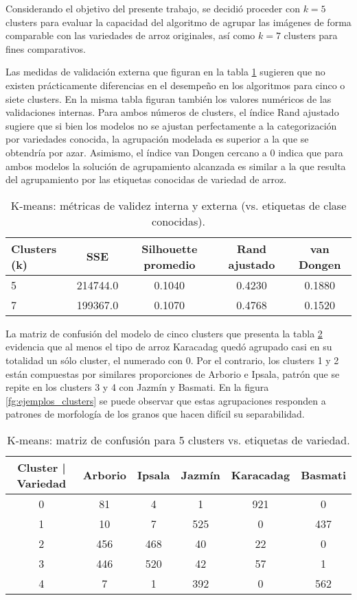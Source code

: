 \documentclass{article}
\begin{document}
Considerando el objetivo del presente trabajo, se decidió proceder con \(k = 5\) clusters para evaluar la capacidad del algoritmo de agrupar las imágenes de forma comparable con las variedades de arroz originales, así como \(k = 7\) clusters para fines comparativos. 

Las medidas de validación externa que figuran en la tabla \ref{tab:kmeans} sugieren que no existen prácticamente diferencias en el desempeño en los algoritmos para cinco o siete clusters.
En la misma tabla figuran también los valores numéricos de las validaciones internas.
Para ambos números de clusters, el índice Rand ajustado sugiere que si bien los modelos no se ajustan perfectamente a la categorización por variedades conocida, la agrupación modelada es superior a la que se obtendría por azar.
Asimismo, el índice van Dongen cercano a 0 indica que para ambos modelos la solución de agrupamiento alcanzada es similar a la que resulta del agrupamiento por las etiquetas conocidas de variedad de arroz.

\begin{table}[!htb]
  \centering
  \begin{tabular}{lcccc}
    \toprule
    Clusters (k) & SSE & Silhouette promedio & Rand ajustado & van Dongen\\
    \midrule
    5 &  214744.0 &  0.1040&  0.4230& 0.1880\\ 
    7 &  199367.0&  0.1070&  0.4768& 0.1520\\
    \bottomrule
  \end{tabular}
  \caption{K-means: métricas de validez interna y externa (vs. etiquetas de clase conocidas).}
  \label{tab:kmeans}
\end{table}

La matriz de confusión del modelo de cinco clusters que presenta la tabla \ref{tab:mc_kmeans5} evidencia que al menos el tipo de arroz Karacadag quedó agrupado casi en su totalidad un sólo cluster, el numerado con 0. 
Por el contrario, los clusters 1 y 2 están compuestas por similares proporciones de Arborio e Ipsala, patrón que se repite en los clusters 3 y 4 con Jazmín y Basmati.
En la figura \ref{fg:ejemplos_clusters} se puede observar que estas agrupaciones responden a patrones de morfología de los granos que hacen difícil su separabilidad.

\begin{table}[!htb]
    \centering
    \begin{tabular}{cccccc}
    \toprule
    Cluster | Variedad &  Arborio &  Ipsala &  Jazmín &  Karacadag & Basmati\\
    \midrule
    0 & 81 & 4& 1 & 921 & 0 \\
    1 & 10 & 7& 525 & 0 & 437 \\
    2 & 456 & 468 & 40 & 22& 0 \\
    3 & 446 & 520 & 42 & 57& 1 \\
    4 & 7 & 1 & 392 & 0 & 562 \\
    \bottomrule
    \end{tabular}
    \caption{K-means: matriz de confusión para 5 clusters vs. etiquetas de variedad.}
    \label{tab:mc_kmeans5}
\end{table}
\end{document}
